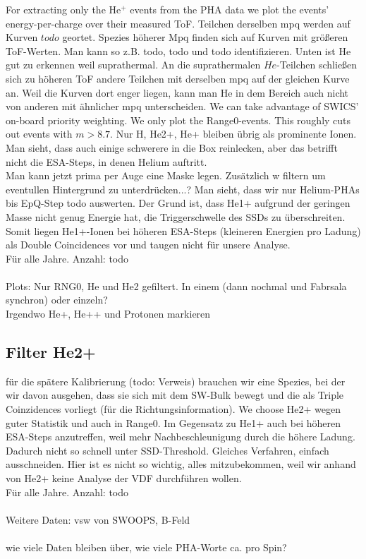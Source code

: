 For extracting only the $\mathrm{He^+}$ events from the PHA data we plot the events' energy-per-charge over their measured ToF. 
Teilchen derselben mpq werden auf Kurven $todo$ geortet. Spezies höherer Mpq finden sich auf Kurven mit größeren ToF-Werten. Man kann so z.B. todo, todo und todo identifizieren. Unten ist He gut zu erkennen weil suprathermal. An die suprathermalen $He$-Teilchen schließen sich zu höheren ToF andere Teilchen mit derselben mpq auf der gleichen Kurve an. Weil die Kurven dort enger liegen, kann man He in dem Bereich auch nicht von anderen mit ähnlicher mpq unterscheiden.
We can take advantage of SWICS' on-board priority weighting. We only plot the Range0-events. This roughly cuts out events with $m>8.7$. Nur H, He2+, He+ bleiben übrig als prominente Ionen. Man sieht, dass auch einige schwerere in die Box reinlecken, aber das betrifft nicht die ESA-Steps, in denen Helium auftritt.\\
Man kann jetzt prima per Auge eine Maske legen. Zusätzlich w filtern um eventullen Hintergrund zu unterdrücken...?
Man sieht, dass wir nur Helium-PHAs bis EpQ-Step todo auswerten. Der Grund ist, dass He1+ aufgrund der geringen Masse nicht genug Energie hat, die Triggerschwelle des SSDs zu überschreiten. Somit liegen He1+-Ionen bei höheren ESA-Steps (kleineren Energien pro Ladung) als Double Coincidences vor und taugen nicht für unsere Analyse.
\\
Für alle Jahre. Anzahl: todo
\\ \\
Plots: Nur RNG0, He und He2 gefiltert. In einem (dann nochmal und Fabrsala synchron) oder einzeln?
\\
Irgendwo He+, He++ und Protonen markieren


\subsection{Filter He2+}
für die spätere Kalibrierung (todo: Verweis) brauchen wir eine Spezies, bei der wir davon ausgehen, dass sie sich mit dem SW-Bulk bewegt und die als Triple Coinzidences vorliegt (für die Richtungsinformation). We choose He2+ wegen guter Statistik und auch in Range0. Im Gegensatz zu He1+ auch bei höheren ESA-Steps anzutreffen, weil mehr Nachbeschleunigung durch die höhere Ladung. Dadurch nicht so schnell unter SSD-Threshold. Gleiches Verfahren, einfach ausschneiden. Hier ist es nicht so wichtig, alles mitzubekommen, weil wir anhand von He2+ keine Analyse der VDF durchführen wollen. 
\\
Für alle Jahre. Anzahl: todo
\\ \\
Weitere Daten: vsw von SWOOPS, B-Feld
\\ \\
wie viele Daten bleiben über, wie viele PHA-Worte ca. pro Spin?
%
%
%






